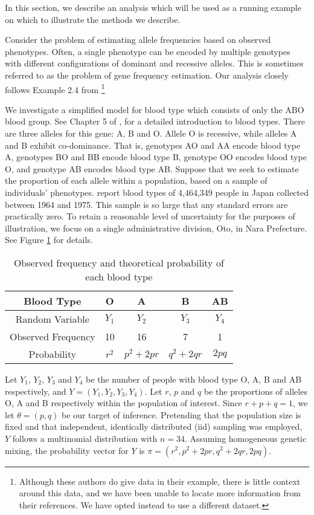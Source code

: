 \documentclass[11pt, oneside]{article}   	%
\begin{document}
In this section, we describe an analysis which will be used as a running example on which to illustrate the methods we describe. 

Consider the problem of estimating allele frequencies based on observed phenotypes. Often, a single phenotype can be encoded by multiple genotypes with different configurations of dominant and recessive alleles. This is sometimes referred to as the problem of gene frequency estimation. Our analysis closely follows Example 2.4 from \citet{McL08}\footnote{Although these authors do give data in their example, there is little context around this data, and we have been unable to locate more information from their references. We have opted instead to use a different dataset.}

We investigate a simplified model for blood type which consists of only the ABO blood group. See Chapter 5 of \citet{Dea05}, for a detailed introduction to blood types. There are three alleles for this gene: A, B and O. Allele O is recessive, while alleles A and B exhibit co-dominance. That is, genotypes AO and AA encode blood type A, genotypes BO and BB encode blood type B, genotype OO encodes blood type O, and genotype AB encodes blood type AB. Suppose that we seek to estimate the proportion of each allele within a population, based on a sample of individuals' phenotypes. \citet{Fuj78} report blood types of 4,464,349 people in Japan collected between 1964 and 1975. This sample is so large that any standard errors are practically zero. To retain a reasonable level of uncertainty for the purposes of illustration, we focus on a single administrative division, Oto, in Nara Prefecture. See Figure \ref{tab2:blood_type} for details.

\begin{table}
    \centering
    \caption{Observed frequency and theoretical probability of each blood type \citep{Fuj78}}
    \begin{tabular}{c|cccc}
        Blood Type & O & A & B & AB\\
        \hline
        Random Variable & $Y_1$ & $Y_2$ & $Y_3$ & $Y_4$\\
        Observed Frequency & 10 & 16 & 7 & 1\\
        Probability & $r^2$ & $p^2 + 2pr$ & $q^2 + 2qr$ & $2pq$
    \end{tabular}
    \label{tab2:blood_type}
\end{table}

Let $Y_1$, $Y_2$, $Y_3$ and $Y_4$ be the number of people with blood type O, A, B and AB respectively, and $Y = (Y_1, Y_2, Y_3, Y_4)$. Let $r$, $p$ and $q$ be the proportions of alleles O, A and B respectively within the population of interest. Since $r + p + q = 1$, we let $\theta = (p, q)$ be our target of inference. Pretending that the population size is fixed and that independent, identically distributed (iid) sampling was employed, $Y$ follows a multinomial distribution with $n = 34$. Assuming homogeneous genetic mixing, the probability vector for $Y$ is $\pi = (r^2, p^2 + 2pr, q^2 + 2qr, 2pq)$.
\end{document}
